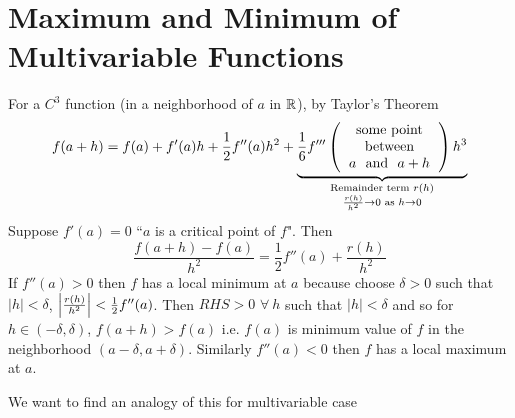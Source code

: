 \chapter{Maximum and Minimum of Multivariable Functions}
For a $C^3$ function (in a neighborhood of $a$ in $\mathbb{R}$), by Taylor's Theorem $$f(a+h)=f(a)+f'(a)h+\frac12f''(a)h^2+\underbrace{\frac16f'''\lt(\begin{tabular}{c}\text{some point}\\ \text{between}\\ $a$ \text{ and } $a+h$\end{tabular}\rt)h^3}_{\substack{ \text{Remainder term }r(h) \\ \frac{r(h)}{h^2}\to 0 \text{ as }h\to 0}}$$Suppose $f'(a)=0$ ``$a$ is a critical point of $f$". Then
$$\frac{f(a+h)-f(a)}{h^2}=\frac12f''(a)+\frac{r(h)}{h^2}$$
If $f''(a)>0$ then $f$ has a local minimum at $a$ because choose $\delta >0$  such that $|h|<\delta$, $\left|\frac{r(h)}{h^2}\right|<\frac12f''(a)$. Then $RHS>0$ $\forall \ h$ such that $|h|<\delta$ and so for $h\in (-\delta,\delta)$, $f(a+h)>f(a)$ i.e. $f(a)$ is minimum value of $f$ in the neighborhood $(a-\delta,a+\delta)$. Similarly $f''(a)<0$ then $f$ has  a local maximum  at $a$. 


We want to find an analogy  of this for multivariable case

